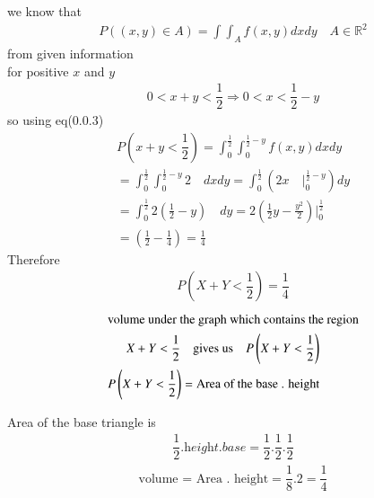 \documentclass[journal,12pt,twocolumn]{IEEEtran}
\begin{document}
we know that
\begin{align}
    P\left(\left(x,y\right)\in A\right)=\int \int _{A}f\left(x,y\right) dx dy \quad  A \in \mathbb{R}^2
\end{align}
from given information\\
for positive $x$ and $y$
\begin{align}
    0<x+y<\dfrac{1}{2}  \Rightarrow 0<x<\dfrac{1}{2}-y
\end{align}
so using eq(0.0.3)
\begin{align}
    P\left(x+y < \dfrac{1}{2}\right)=\int_{0}^{\frac{1}{2}} \int _{0}^{\frac{1}{2}-y}f(x,y) dx dy\\
    =\int_{0}^{\frac{1}{2}} \int _{0}^{\frac{1}{2}-y} 2 \quad dx dy
    =\int_{0}^{\frac{1}{2}} \left(  2 x \quad \big|_{0}^{\frac{1}{2}-y} \right)  dy\\
    =\int_{0}^{\frac{1}{2}}   2 \left(\frac{1}{2}-y\right) \quad    dy
    =2\left( \frac{1}{2} y - \frac{y^2}{2}  \right) \big|_{0}^{\frac{1}{2}}\\
    = \left( \frac{1}{2} - \frac{1}{4}\right) = \frac{1}{4} 
\end{align}
Therefore 
\begin{align}
    P\left(X+Y<\dfrac{1}{2}\right)=\dfrac{1}{4}
\end{align}
\begin{align}
\intertext{volume under the graph which contains the region} X+Y<\dfrac{1}{2} \quad \text{gives us} \quad P\left(X+Y<\dfrac{1}{2}\right) \\
 P\left(X+Y<\dfrac{1}{2}\right)= \text{Area of the base . height}
 \end{align}
 
Area of the base triangle is 
\begin{align}
 \dfrac{1}{2}.\textit{height}.\textit{base} =\dfrac{1}{2}.\dfrac{1}{2}.\dfrac{1}{2}
 \end{align}
 \begin{align}
\text{volume = Area . height}=\dfrac{1}{8}. 2= \dfrac{1}{4}
\end{align}
\end{document}
